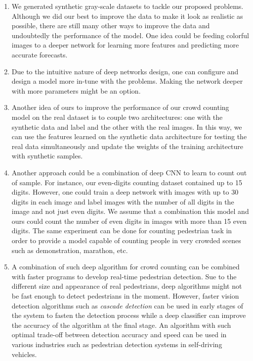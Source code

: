 \begin{enumerate}
\item We generated synthetic gray-scale datasets to tackle our proposed problems. Although we did our best  to improve the data to make it look as realistic as possible, there are still many other ways to improve the data and undoubtedly the performance of the model. One idea could be feeding colorful images to a deeper network for learning more features and predicting more accurate forecasts.   
\item Due to the intuitive nature of deep networks design, one can configure and design a model more in-tune with the problems. Making the network deeper with more parameters might be an option.
\item Another idea of ours to improve the performance of our crowd counting model on the real dataset is to couple two architectures: one with the synthetic data and label and the other with the real images. In this way, we can use the features learned on the synthetic data architecture for testing the real data simultaneously and update the weights of the training architecture with synthetic samples. 
\item Another approach  could be a combination of deep CNN to learn to count out of sample. For instance, our even-digits counting dataset contained up to 15 digits. However, one could train a deep network with images with up to 30 digits in each image and label images with the number of all digits in the image and not just even digits. We assume that a combination this model and ours could count the number of even digits in images with more than 15 even digits. The same experiment can be done for counting pedestrian task in order to provide a model capable of counting people in very crowded scenes such as demonstration, marathon, etc. 
\item A combination of such deep algorithm for crowd counting can be combined with faster programs to develop real-time pedestrian detection. Sue to the different size and appearance of real pedestrians, deep algorithms might not be fast enough to detect pedestrians in the moment. However, faster vision detection algorithms such as \textit{cascade detection} can be used in early stages of the system to fasten the detection  process while a deep classifier can improve the accuracy of the algorithm at the final stage. An algorithm with such optimal trade-off between detection accuracy and speed can be used in various industries such as pedestrian detection systems in self-driving vehicles. 
\end{enumerate}  


